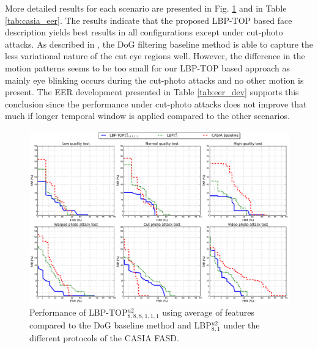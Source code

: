 More detailed results for each scenario are presented in Fig. \ref{fig:DET_protocols} and in Table \ref{tab:casia_eer}. The results indicate that the proposed LBP-TOP based face description yields best results in all configurations except under cut-photo attacks. As described in \cite{zhangface}, the DoG filtering baseline method is able to capture the less variational nature of the cut eye regions well. However, the difference in the motion patterns seems to be too small for our LBP-TOP based approach as mainly eye blinking occurs during the cut-photo attacks and no other motion is present. The EER development presented in Table \ref{tab:eer_dev} supports this conclusion since the performance under cut-photo attacks does not improve that much if longer temporal window is applied compared to the other scenarios. 

\begin{figure}[h]
\begin{center}
\includegraphics [width=\textwidth] {images/proposed_countermeasure/casia_overall_XYT_XY_baseline.pdf}
\caption[Performance of LBP-TOP$_{8,8,8,1,1,1}^{u2}$ using average of features compared to the DoG baseline method]{Performance of LBP-TOP$_{8,8,8,1,1,1}^{u2}$ using average of features compared to the DoG baseline method and LBP$_{8,1}^{u2}$ under the different protocols of the CASIA FASD. } \label{fig:DET_protocols}
\end{center}
\end{figure}

